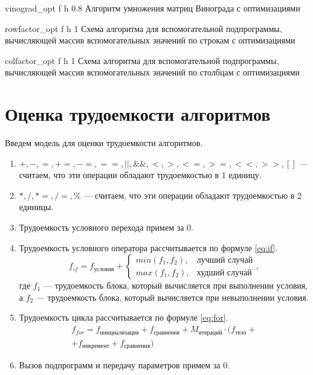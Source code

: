 {vinograd_opt} %
{f} %
{h} %
{0.8\textwidth} %
{Алгоритм умножения матриц Винограда с оптимизациями} %

{rowfactor_opt} %
{f} %
{h} %
{1\textwidth} %
{Схема алгоритма для вспомогательной подпрограммы, вычисляющей массив вспомогательных значений по строкам с оптимизациями} %

{colfactor_opt} %
{f} %
{h} %
{1\textwidth} %
{Схема алгоритма для вспомогательной подпрограммы, вычисляющей массив вспомогательных значений по столбцам с оптимизациями} %

\clearpage

\section{Оценка трудоемкости алгоритмов}

Введем модель для оценки трудоемкости алгоритмов.
\begin{enumerate}
	\item $+, -, =, +=, -=, ==, ||, \&\&, <, >, <=, >=, <<, >>, []$ --- считаем, что эти операции обладают трудоемкостью в 1 единицу.
	\item $*, /, *=, /=, \% $ --- считаем, что эти операции обладают трудоемкостью в 2 единицы.
	\item Трудоемкость условного перехода примем за $0$.
	\item Трудоемкость условного оператора рассчитывается по формуле \eqref{eq:if}. 
	\begin{equation}
		\label{eq:if}
		f_{if} = f_{\text{условия}} + 
		\begin{cases}
			min(f_1, f_2), & \text{лучший случай}\\
			max(f_1, f_2), & \text{худший случай}
		\end{cases},
	\end{equation}
	где $f_1$ --- трудоемкость блока, который вычисляется при выполнении условия, а $f_2$ --- трудоемкость блока, который вычисляется при невыполнении условия.
	\item Трудоемкость цикла рассчитывается по формуле \eqref{eq:for}.
	\begin{equation}
		\label{eq:for}
		\begin{gathered}
			f_{for} = f_{\text{инициализация}} + f_{\text{сравнения}} + M_{\text{итераций}} \cdot (f_{\text{тело}} +\\
			+ f_{\text{инкремент}} + f_{\text{сравнения}})
		\end{gathered}
	\end{equation}
	\item Вызов подпрограмм и передачу параметров примем за $0$.
\end{enumerate}


